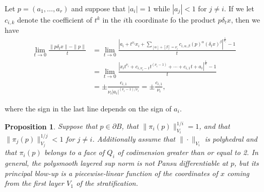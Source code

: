 \documentclass{article}
\newtheorem{prop}[theorem]{Proposition}
\theoremstyle{definition}
\newcommand{\norm}[1]{\|#1\|}
\begin{document}
Let $p = (a_1, \ldots, a_r)$ and suppose that $|a_i| = 1$ while $|a_j| < 1$ for $j \neq i$. If we let $c_{i,k}$ denote the coefficient of $t^k$ in the $i$th coordinate fo the product $p\delta_tx$, then we have
\begin{align*}
\lim_{t\to0}\frac{\norm{p \delta_tx}-\norm{p}}{t} & = \lim_{t\to 0} \frac{\left| a_i + t^{\nu_i}x_i + \sum_{ [\alpha] + [\beta] = \nu_i} c_{i,\alpha,\beta}(p)^\alpha(\delta_tx)^\beta \right|^\frac1{\nu_i} - 1}{t}\\
& = \lim_{t\to 0} \frac{\left| x_it^{\nu_i} + c_{i,\nu_i-1}t^{(\nu_i-1)} + \cdots + c_{i,1}t + a_i \right|^\frac1{\nu_i} - 1}{t}\\
& = \pm \frac{c_{i,1}}{\nu_i|a_i|^{(\nu_i-1)/\nu_i}} = \pm \frac{c_{i,1}}{\nu_i},
\end{align*}

where the sign in the last line depends on the sign of $a_i$.

\begin{prop}\label{prop:edges} Suppose that $p \in \partial B$, that $\norm{\pi_i(p)}_{V_i}^{1/i} = 1$, and that $\norm{\pi_j(p)}_{V_j}^{1/j} < 1$ for $j\neq i$. Additionally assume that $\norm{\cdot}_{V_i}$ is polyhedral and that $\pi_i(p)$ belongs to a face of $Q_i$ of codimension greater than or equal to 2. In general, the polysmooth layered sup norm
is not Pansu differentiable at $p$, but its principal blow-up is a piecewise-linear function of the coordinates of $x$ coming from the first layer $V_1$ of the stratification.
\end{prop}
\end{document}
